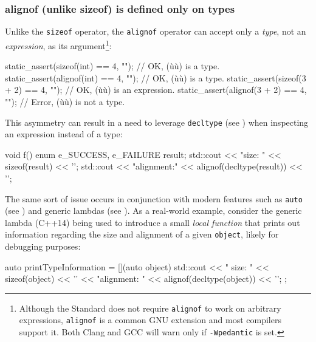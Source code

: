 \subsubsection[\lstinline!alignof! (unlike \lstinline!sizeof!) is defined only on types]{{\SubsubsecCode alignof} (unlike {\SubsubsecCode sizeof}) is defined only on types}\label{alignof-(unlike-sizeof)-is-defined-only-on-types}

Unlike the \lstinline!sizeof! operator, the \lstinline!alignof! operator can accept only a \emph{type}, not an \emph{expression}, as its argument{\cprotect\footnote{Although
the Standard does not require \lstinline!alignof! to work on arbitrary
expressions, \lstinline!alignof! is a common GNU extension and most compilers support
  it. Both Clang and GCC will warn only if \lstinline!-Wpedantic! is set.}}:

\begin{emcppslisting}
static_assert(sizeof(int)  == 4, "");     // OK, (ù{}ù) is a type.
static_assert(alignof(int) == 4, "");     // OK, (ù{}ù) is a type.
static_assert(sizeof(3 + 2) == 4, "");    // OK, (ù{}ù) is an expression.           
static_assert(alignof(3 + 2) == 4, "");   // Error, (ù{}ù) is not a type.
\end{emcppslisting}
    
\noindent This asymmetry can result in a need to leverage
\lstinline!decltype! (see ) when inspecting an expression instead
of a type:

\begin{emcppslisting}
void f()
{
    enum { e_SUCCESS, e_FAILURE } result;
    std::cout << "size: " << sizeof(result) << '\n';
    std::cout << "alignment:" << alignof(decltype(result)) << '\n';
}
\end{emcppslisting}
    
\noindent The same sort of issue occurs in conjunction with modern  features such as \lstinline!auto! (see ) and
generic lambdas (see ). As a real-world example, consider the
generic lambda (C++14) being used to introduce a small
\emph{local function} that prints out information regarding the size and
alignment of a given \lstinline!object!, likely for debugging purposes:

\begin{emcppslisting}
auto printTypeInformation = [](auto object)
{
    std::cout << "     size: " << sizeof(object) << '\n'
              << "alignment: " << alignof(decltype(object)) << '\n';
};
\end{emcppslisting}
    
